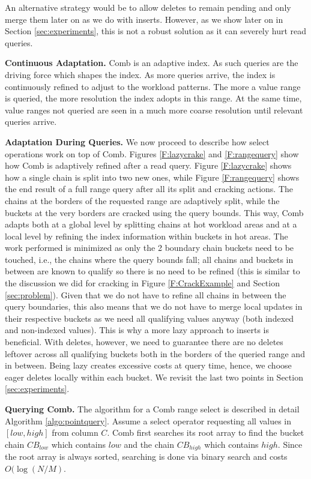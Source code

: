 \documentclass{sig-alternate}
\begin{document}
An alternative strategy would be to allow deletes to remain pending and only merge them later on
as we do with inserts. However, as we show later on in Section \ref{sec:experiments},
this is not a robust solution as it can severely hurt read queries.

\textbf{Continuous Adaptation.}
Comb is an adaptive index. As such queries are the driving force which shapes the index.
As more queries arrive, the index is continuously refined to adjust to the workload patterns.
The more a value range is queried, the more resolution the index adopts in this range.
At the same time, value ranges not queried are seen in a much more coarse resolution until relevant queries arrive.

\textbf{Adaptation During Queries.}
We now proceed to describe how select operations work  on top of Comb.
Figures \ref{F:lazycrake} and \ref{F:rangequery}  show how Comb is adaptively refined after a read query.
Figure \ref{F:lazycrake} shows how a single chain is split into two new ones,
while Figure \ref{F:rangequery} shows the end result of a full range query after all its split and cracking actions.
The chains at the borders of the requested range are adaptively split, while the buckets
at the very borders are cracked using the query bounds.
This way, Comb adapts both at a global level by splitting chains at hot workload areas
and at a local level by refining the index information within buckets in hot areas.
The work performed is minimized as only the 2 boundary chain buckets need to be touched, i.e., the chains where the query bounds fall;
all chains and buckets in between are known to qualify so there is no need to be refined
(this is similar to the discussion we did for cracking
in Figure \ref{F:CrackExample} and Section \ref{sec:problem}).
Given that we do not have to refine all chains in between the query boundaries,
this also means that we do not have to merge local updates in their respective buckets
as we need all qualifying values anyway (both indexed and non-indexed values).
This is why a more lazy approach to inserts is beneficial.
With deletes, however, we need to guarantee there are no deletes leftover across all qualifying buckets
both in the borders of the queried range and in between. Being lazy creates excessive costs at query time, hence,
we choose eager deletes locally within each bucket.
We revisit the last two points in Section \ref{sec:experiments}.


\textbf{Querying Comb.}
The algorithm for a Comb range select is described in detail Algorithm \ref{algo:pointquery}.
Assume a select operator requesting all values in $[low,high]$ from column $C$.
Comb first searches its root array to find the bucket chain $CB_{low}$
which contains $low$ and the chain $CB_{high}$ which contains $high$.
Since the root array is always sorted, searching is done via binary search and costs $O(\log(N/M)$.
\end{document}
